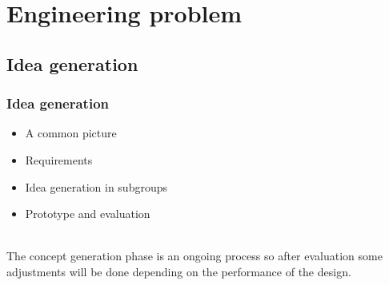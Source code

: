 \documentclass{beamer}
\begin{document}
\section{Engineering problem}
\begin{frame}
    \subsection{Idea generation}
    \frametitle{Idea generation} 
    \begin{itemize}
        \item A common picture
        \item Requirements
        \item Idea generation in subgroups
        \item Prototype and evaluation\\~\
    \end{itemize} 

    The concept generation phase is an ongoing process so after evaluation
    some adjustments will be done depending on the performance
    of the design.
\end{frame}
\end{document}
